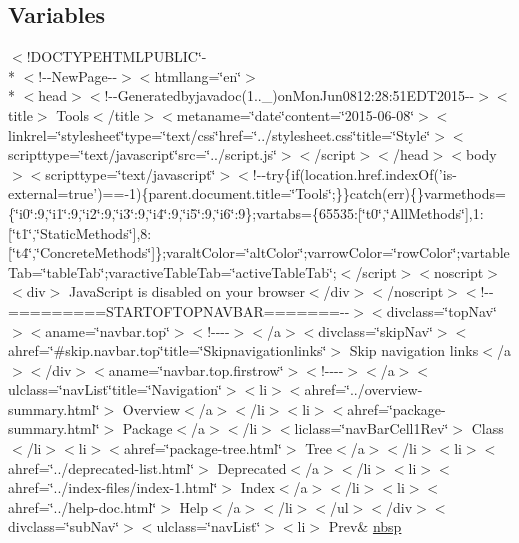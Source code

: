 \subsection*{Variables}
\begin{DoxyCompactItemize}
\item 
$<$!D\-O\-C\-T\-Y\-P\-E\-H\-T\-M\-L\-P\-U\-B\-L\-I\-C\char`\"{}-\/\\*
$<$!-\/-\/New\-Page-\/-\/$>$$<$htmllang=\char`\"{}en\char`\"{}$>$\\*
$<$head$>$$<$!-\/-\/Generatedbyjavadoc(1..\-\_)on\-Mon\-Jun0812\-:28\-:51\-E\-D\-T2015-\/-\/$>$$<$title$>$ Tools$<$/title$>$$<$metaname=\char`\"{}date\char`\"{}content=\char`\"{}2015-\/06-\/08\char`\"{}$>$$<$linkrel=\char`\"{}stylesheet\char`\"{}type=\char`\"{}text/css\char`\"{}href=\char`\"{}../stylesheet.\-css\char`\"{}title=\char`\"{}\-Style\char`\"{}$>$$<$scripttype=\char`\"{}text/javascript\char`\"{}src=\char`\"{}../script.\-js\char`\"{}$>$$<$/script$>$$<$/head$>$$<$body$>$$<$scripttype=\char`\"{}text/javascript\char`\"{}$>$$<$!-\/-\/try\{if(location.\-href.\-index\-Of('is-\/external=true')==-\/1)\{parent.\-document.\-title=\char`\"{}\-Tools\char`\"{};\}\}catch(err)\{\}varmethods=\{\char`\"{}i0\char`\"{}\-:9,\char`\"{}i1\char`\"{}\-:9,\char`\"{}i2\char`\"{}\-:9,\char`\"{}i3\char`\"{}\-:9,\char`\"{}i4\char`\"{}\-:9,\char`\"{}i5\char`\"{}\-:9,\char`\"{}i6\char`\"{}\-:9\};vartabs=\{65535\-:\mbox{[}\char`\"{}t0\char`\"{},\char`\"{}\-All\-Methods\char`\"{}\mbox{]},1\-:\mbox{[}\char`\"{}t1\char`\"{},\char`\"{}\-Static\-Methods\char`\"{}\mbox{]},8\-:\mbox{[}\char`\"{}t4\char`\"{},\char`\"{}\-Concrete\-Methods\char`\"{}\mbox{]}\};varalt\-Color=\char`\"{}alt\-Color\char`\"{};varrow\-Color=\char`\"{}row\-Color\char`\"{};vartable\-Tab=\char`\"{}table\-Tab\char`\"{};varactive\-Table\-Tab=\char`\"{}active\-Table\-Tab\char`\"{};$<$/script$>$$<$noscript$>$$<$div$>$ Java\-Script is disabled on your browser$<$/div$>$$<$/noscript$>$$<$!-\/-\/=========\-S\-T\-A\-R\-T\-O\-F\-T\-O\-P\-N\-A\-V\-B\-A\-R=======-\/-\/$>$$<$divclass=\char`\"{}top\-Nav\char`\"{}$>$$<$aname=\char`\"{}navbar.\-top\char`\"{}$>$$<$!-\/-\/-\/-\/$>$$<$/a$>$$<$divclass=\char`\"{}skip\-Nav\char`\"{}$>$$<$ahref=\char`\"{}\#skip.\-navbar.\-top\char`\"{}title=\char`\"{}\-Skipnavigationlinks\char`\"{}$>$ Skip navigation links$<$/a$>$$<$/div$>$$<$aname=\char`\"{}navbar.\-top.\-firstrow\char`\"{}$>$$<$!-\/-\/-\/-\/$>$$<$/a$>$$<$ulclass=\char`\"{}nav\-List\char`\"{}title=\char`\"{}\-Navigation\char`\"{}$>$$<$li$>$$<$ahref=\char`\"{}../overview-\/summary.\-html\char`\"{}$>$ Overview$<$/a$>$$<$/li$>$$<$li$>$$<$ahref=\char`\"{}package-\/summary.\-html\char`\"{}$>$ Package$<$/a$>$$<$/li$>$$<$liclass=\char`\"{}nav\-Bar\-Cell1\-Rev\char`\"{}$>$ Class$<$/li$>$$<$li$>$$<$ahref=\char`\"{}package-\/tree.\-html\char`\"{}$>$ Tree$<$/a$>$$<$/li$>$$<$li$>$$<$ahref=\char`\"{}../deprecated-\/list.\-html\char`\"{}$>$ Deprecated$<$/a$>$$<$/li$>$$<$li$>$$<$ahref=\char`\"{}../index-\/files/index-\/1.\-html\char`\"{}$>$ Index$<$/a$>$$<$/li$>$$<$li$>$$<$ahref=\char`\"{}../help-\/doc.\-html\char`\"{}$>$ Help$<$/a$>$$<$/li$>$$<$/ul$>$$<$/div$>$$<$divclass=\char`\"{}sub\-Nav\char`\"{}$>$$<$ulclass=\char`\"{}nav\-List\char`\"{}$>$$<$li$>$ Prev\& \hyperlink{_tools_8html_aef915316f784c9063d942974538301a6}{nbsp}

\end{DoxyCompactItemize}
